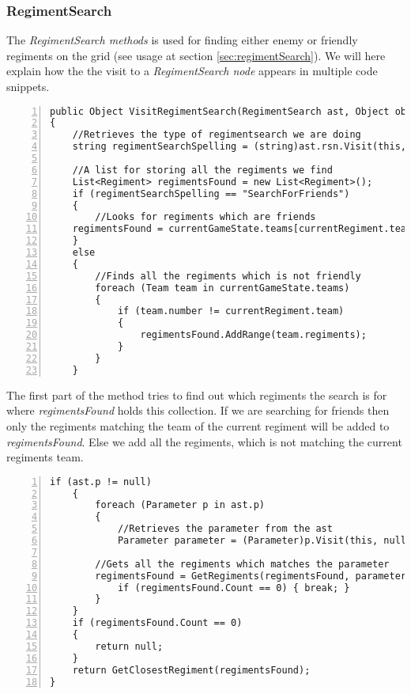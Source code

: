 	\subsubsection{RegimentSearch}
		The {\it RegimentSearch methods} is used for finding either enemy or friendly regiments on 
		the grid (see usage at section \ref{sec:regimentSearch}). 
		We will here explain how the the visit to a {\it RegimentSearch node} appears in multiple code snippets.
		\begin{lstlisting}[basicstyle=\small\sffamily,
			keywords={break,case,const,continue,default,else,enum,
			for,if,return,switch,while,do,long,void,int,float,double,
			char,struct,typedef,include,size\_t},
			keywordstyle={\color{blue}},
			comment={[l]{//}}, morecomment={[s]{/*}{*/}}, commentstyle=\itshape,
			columns={[l]flexible}, numbers=left, numberstyle=\tiny,
			frameround=fftt, frame=shadowbox, captionpos=b,
			caption={1. part of visit of RegimentSearch node in the class BehaviourInterpreter},
			label=impl:regsearch1]		
public Object VisitRegimentSearch(RegimentSearch ast, Object obj)
{
	//Retrieves the type of regimentsearch we are doing
	string regimentSearchSpelling = (string)ast.rsn.Visit(this, null);

	//A list for storing all the regiments we find
	List<Regiment> regimentsFound = new List<Regiment>();
	if (regimentSearchSpelling == "SearchForFriends")
	{
		//Looks for regiments which are friends
	regimentsFound = currentGameState.teams[currentRegiment.team].regiments;
	}
	else
	{
		//Finds all the regiments which is not friendly
		foreach (Team team in currentGameState.teams)
		{
			if (team.number != currentRegiment.team)
			{
				regimentsFound.AddRange(team.regiments);
			}
		}
	}
		\end{lstlisting}
		The first part of the method tries to find out which regiments the search is for where {\it regimentsFound} holds this collection. 
		If we are searching for friends then only the regiments matching the team of the current regiment will be added to {\it regimentsFound}.
		Else we add all the regiments, which is not matching the current regiments team.
		\begin{lstlisting}[basicstyle=\small\sffamily,
			keywords={break,case,const,continue,default,else,enum,
			for,if,return,switch,while,do,long,void,int,float,double,
			char,struct,typedef,include,size\_t},
			keywordstyle={\color{blue}},
			comment={[l]{//}}, morecomment={[s]{/*}{*/}}, commentstyle=\itshape,
			columns={[l]flexible}, numbers=left, numberstyle=\tiny,
			frameround=fftt, frame=shadowbox, captionpos=b,
			caption={1. part of visit of RegimentSearch node in the class BehaviourInterpreter},
			label=impl:regsearch2]
	if (ast.p != null)
	{
		foreach (Parameter p in ast.p)
		{
			//Retrieves the parameter from the ast
			Parameter parameter = (Parameter)p.Visit(this, null);

		//Gets all the regiments which matches the parameter
		regimentsFound = GetRegiments(regimentsFound, parameter);
			if (regimentsFound.Count == 0) { break; }
		}
	}
	if (regimentsFound.Count == 0)
	{
		return null;
	}
	return GetClosestRegiment(regimentsFound);
}
	\end{lstlisting}
